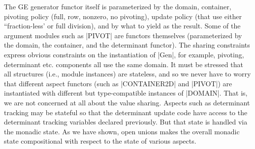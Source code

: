 \documentclass{llncs}
\begin{document}
The GE generator functor itself is 
parameterized by the domain, container, pivoting policy (full, row,
nonzero, no pivoting), update policy (that use either ``fraction-less'
or full division), and by what to yield as the result. Some of the
argument modules such as |PIVOT| are functors themselves (parameterized
by the domain, the container, and the determinant functor). The sharing
constraints express obvious constraints on the instantiation of |Gen|,
for example, pivoting, determinant etc. components all use the same
domain. It must be stressed that all structures (i.e., module
instances) are stateless, and so we never have to worry that different
aspect functors (such as |CONTAINER2D| and |PIVOT|) are instantiated
with different but type-compatible instances of |DOMAIN|. That is, we
are not concerned at all about the value sharing. Aspects such as
determinant tracking may be stateful so that the determinant update
code have access to the determinant tracking variables declared
previously. But that state is handled via the monadic state. As we
have shown, open unions makes the overall monadic state compositional
with respect to the state of various aspects.
\end{document}
